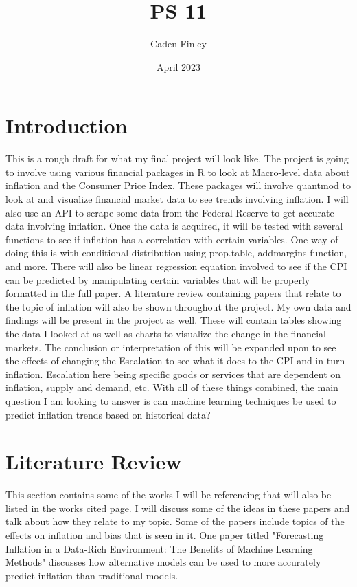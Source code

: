 \documentclass{article}
\title{PS 11}
\author{Caden Finley}
\date{April 2023}
\begin{document}
\maketitle

\section{Introduction}

This is a rough draft for what my final project will look like. The project is going to involve using various financial packages in R to look at Macro-level data about inflation and the Consumer Price Index. These packages will involve quantmod to look at and visualize financial market data to see trends involving inflation. I will also use an API to scrape some data from the Federal Reserve to get accurate data involving inflation. Once the data is acquired, it will be tested with several functions to see if inflation has a correlation with certain variables. One way of doing this is with conditional distribution using prop.table, addmargins function, and more. There will also be linear regression equation involved to see if the CPI can be predicted by manipulating certain variables that will be properly formatted in the full paper. A literature review containing papers that relate to the topic of inflation will also be shown throughout the project. My own data and findings will be present in the project as well. These will contain tables showing the data I looked at as well as charts to visualize the change in the financial markets. The conclusion or interpretation of this will be expanded upon to see the effects of changing the Escalation to see what it does to the CPI and in turn inflation. Escalation here being specific goods or services that are dependent on inflation, supply and demand, etc. With all of these things combined, the main question I am looking to answer is can machine learning techniques be used to predict inflation trends based on historical data?

\section{Literature Review}

This section contains some of the works I will be referencing that will also be listed in the works cited page. I will discuss some of the ideas in these papers and talk about how they relate to my topic. Some of the papers include topics of the effects on inflation and bias that is seen in it. One paper titled "Forecasting Inflation in a Data-Rich Environment: The Benefits of Machine Learning Methods" discusses how alternative models can be used to more accurately predict inflation than traditional models. 
\end{document}
